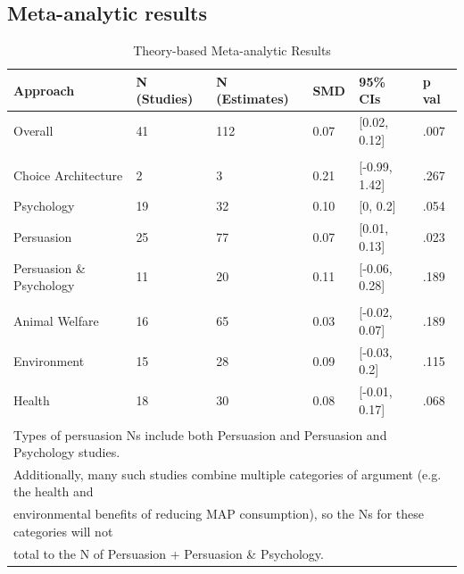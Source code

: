 \documentclass[sn-nature,referee,pdflatex]{sn-jnl}
\begin{document}
\subsection{Meta-analytic results}\label{sec2.3}

\begin{table}[!ht]
\centering
\caption{\label{tab:table_one}Theory-based Meta-analytic Results}
\centering
\begin{tabular}[t]{llllll}
\toprule
Approach & N (Studies) & N (Estimates) & SMD & 95\% CIs & p val\\
\midrule
Overall & 41 & 112 & 0.07 & {}[0.02, 0.12] & .007\\
\addlinespace[0.5em]
\multicolumn{6}{l}{\textbf{Theory}}\\
\hspace{1em}Choice Architecture & 2 & 3 & 0.21 & {}[-0.99, 1.42] & .267\\
\hspace{1em}Psychology & 19 & 32 & 0.10 & {}[0, 0.2] & .054\\
\hspace{1em}Persuasion & 25 & 77 & 0.07 & {}[0.01, 0.13] & .023\\
\hspace{1em}Persuasion \& Psychology & 11 & 20 & 0.11 & {}[-0.06, 0.28] & .189\\
\addlinespace[0.5em]
\multicolumn{6}{l}{\textbf{Type of Persuasion}}\\
\hspace{1em}Animal Welfare & 16 & 65 & 0.03 & {}[-0.02, 0.07] & .189\\
\hspace{1em}Environment & 15 & 28 & 0.09 & {}[-0.03, 0.2] & .115\\
\hspace{1em}Health & 18 & 30 & 0.08 & {}[-0.01, 0.17] & .068\\
\bottomrule
\multicolumn{6}{l}{\textsuperscript{} Types of persuasion Ns include both Persuasion and Persuasion and Psychology studies.}\\
\multicolumn{6}{l}{Additionally, many such studies combine multiple categories of argument (e.g. the health and}\\
\multicolumn{6}{l}{environmental benefits of reducing MAP consumption), so the Ns for these categories will not}\\
\multicolumn{6}{l}{total to the N of Persuasion + Persuasion \& Psychology.}\\
\end{tabular}
\end{table}
\end{document}

